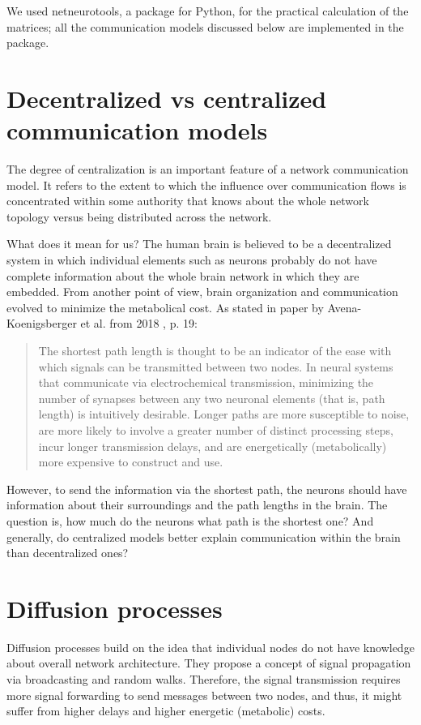 We used netneurotools, a package for Python, for the practical calculation of the matrices; all the communication models discussed below are implemented in the package.

\section{Decentralized vs centralized communication models}

The degree of centralization is an important feature of a network communication model. It refers to the extent to which the influence over communication flows is concentrated within some authority that knows about the whole network topology versus being distributed across the network. \cite{seguin_brain_2023}

What does it mean for us? The human brain is believed to be a decentralized system in which individual elements such as neurons probably do not have complete information about the whole brain network in which they are embedded. \cite{seguin_brain_2023} From another point of view, brain organization and communication evolved to minimize the metabolical cost. \cite{bullmore_economy_2012} As stated in paper by Avena-Koenigsberger et al. from 2018 \cite{avena-koenigsberger_communication_2018}, p. 19:
\begin{quote}
The shortest path length is thought to be an indicator of the ease with which signals can be transmitted between two nodes. In neural systems that communicate via electrochemical transmission, minimizing the number of synapses between any two neuronal elements (that is, path length) is intuitively desirable. Longer paths are more susceptible to noise, are more likely to involve a greater number of distinct processing steps, incur longer transmission delays, and are energetically (metabolically) more expensive to construct and use.
\end{quote}
However, to send the information via the shortest path, the neurons should have information about their surroundings and the path lengths in the brain. The question is, how much do the neurons  what path is the shortest one? And generally, do centralized models better explain communication within the brain than decentralized ones?

\section{Diffusion processes}

Diffusion processes build on the idea that individual nodes do not have knowledge about overall network architecture. They propose a concept of signal propagation via broadcasting and random walks. Therefore, the signal transmission requires more signal forwarding to send messages between two nodes, and thus, it might suffer from higher delays and higher energetic (metabolic) costs. \cite{seguin_brain_2023}

